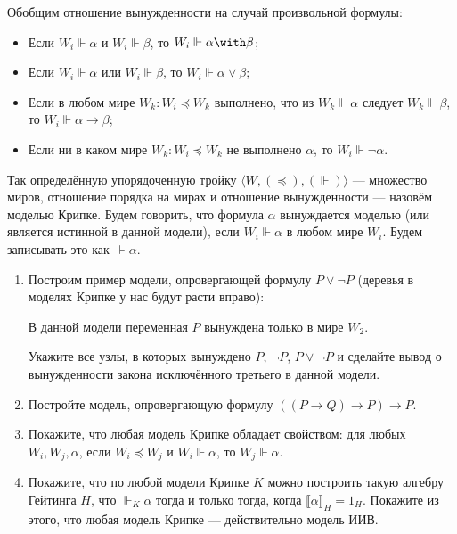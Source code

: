 \documentclass[10pt,a4paper,oneside]{article}
\begin{document}
\begin{enumerate}
Обобщим отношение вынужденности на случай произвольной формулы:
\begin{itemize}
\item Если $W_i \Vdash \alpha$ и $W_i \Vdash \beta$, то $W_i \Vdash \alpha\with\beta$;
\item Если $W_i \Vdash \alpha$ или $W_i \Vdash \beta$, то $W_i \Vdash \alpha\vee\beta$;
\item Если в любом мире $W_k: W_i \preceq W_k$ выполнено, что из $W_k \Vdash \alpha$ следует $W_k \Vdash \beta$, 
то $W_i \Vdash \alpha\rightarrow\beta$;
\item Если ни в каком мире $W_k: W_i \preceq W_k$ не выполнено $\alpha$, то $W_i \Vdash \neg\alpha$.
\end{itemize}

Так определённую упорядоченную тройку $\langle W, (\preceq), (\Vdash) \rangle$ --- множество миров, отношение 
порядка на мирах и отношение вынужденности --- назовём моделью Крипке.
Будем говорить, что формула $\alpha$ вынуждается моделью (или является истинной в данной модели),
если $W_i \Vdash \alpha$ в любом мире $W_i$. Будем записывать это как $\Vdash \alpha$.

\begin{enumerate}
\item Построим пример модели, опровергающей формулу $P \vee\neg P$
(деревья в моделях Крипке у нас будут расти вправо):
\begin{center}\end{center}

В данной модели переменная $P$ вынуждена только в мире $W_2$.

Укажите все узлы, в которых вынуждено $P$, $\neg P$, $P \vee\neg P$ и сделайте вывод о вынужденности
закона исключённого третьего в данной модели.

\item Постройте модель, опровергающую формулу $((P\rightarrow Q)\rightarrow P)\rightarrow P$.

\item Покажите, что любая модель Крипке обладает свойством: для любых $W_i, W_j, \alpha$, 
если $W_i \preceq W_j$ и $W_i \Vdash \alpha$, то $W_j \Vdash \alpha$.

\item Покажите, что по любой модели Крипке $K$ можно построить такую алгебру Гейтинга $H$, что
$\Vdash_K \alpha$ тогда и только тогда, когда $\llbracket\alpha\rrbracket_H = 1_H$. 
Покажите из этого, что любая модель Крипке --- действительно модель ИИВ.


\end{enumerate}
\end{enumerate}
\end{document}
